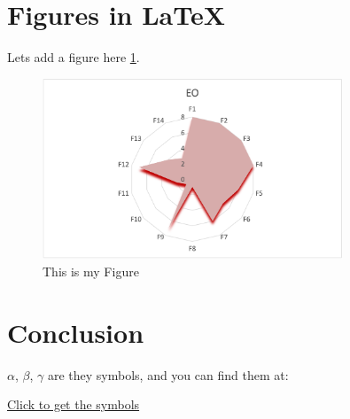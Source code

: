 \documentclass[review]{elsarticle}
\begin{document}
\section{Figures in LaTeX} \label{section:3}

Lets add a figure here \ref{fig:1}. 


\begin{figure}[ht]
    \centering
    \includegraphics[width=0.8\textwidth]{EO.png}
    \caption{This is my Figure} \label{fig:1}
\end{figure}


\section{Conclusion} \label{section:5}

$\alpha$, $\beta$, $\gamma$ are they symbols, and you can find them at: 

\href{https://oeis.org/wiki/List_of_LaTeX_mathematical_symbols}{Click to get the symbols}





\end{document}
